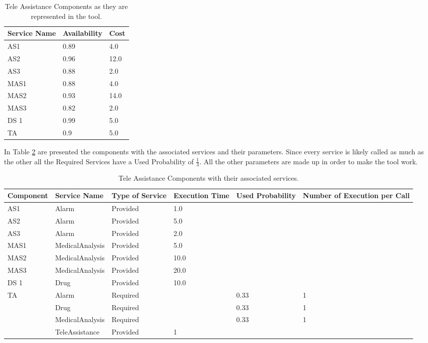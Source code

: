 \begin{table}[ht!b]
	\centering
	\begin{tabular}{|p{5cm}|p{3cm}|p{3cm}|}
		\hline 
		\textbf{Service Name} & \textbf{Availability} & \textbf{Cost} \\ 
		\hline 
		AS1 & 0.89 & 4.0 \\
		\hline 
		AS2 & 0.96 & 12.0 \\ 
		\hline 
		AS3 & 0.88 & 2.0 \\ 
		\hline 
		MAS1 & 0.88 & 4.0 \\ 
		\hline
		MAS2 & 0.93 & 14.0 \\ 
		\hline
		MAS3 & 0.82 & 2.0 \\ 
		\hline
		DS 1 & 0.99 & 5.0 \\ 
		\hline
		TA & 0.9 & 5.0 \\ 
		\hline
		
	\end{tabular} 
	\caption[TAS Components]{Tele Assistance Components as they are represented in the tool.}
	\label{tab:tas-comp}
\end{table}
In Table \ref{tab:tas-serv} are presented the components with the associated services and their parameters. Since every service is likely called as much as the other all the Required Services have a Used Probability of $ \frac{1}{3} $. All the other parameters are made up in order to make the tool work.
\begin{table}[ht!b]
	\centering
	\begin{tabular}{|p{2cm}|p{2.7cm}|p{1.7cm}|p{1.7cm}|p{1.7cm}|p{1.7cm}|}
		\hline 
		\textbf{Component} & \textbf{Service Name} & \textbf{Type of Service} & \textbf{Execution Time} & \textbf{Used Probability} & \textbf{Number of Execution per Call} \\ 
		\hline 
		AS1 & Alarm & Provided & 1.0 & & \\
		\hline 
		AS2 & Alarm & Provided & 5.0 & & \\
		\hline 
		AS3 & Alarm & Provided & 2.0 & & \\
		\hline 
		MAS1 & MedicalAnalysis & Provided & 5.0 & & \\ 
		\hline
		MAS2 & MedicalAnalysis & Provided & 10.0 & & \\ 
		\hline
		MAS3 & MedicalAnalysis & Provided & 20.0 & & \\ 
		\hline
		DS 1 & Drug & Provided & 10.0 & & \\
		\hline
		\multirow{4}{*}{TA} & Alarm & Required & & 0.33 & 1 \\
		& Drug & Required & & 0.33 & 1 \\
		& MedicalAnalysis & Required & & 0.33 & 1 \\
		& TeleAssistance & Provided & 1 & & \\
		\hline
		
	\end{tabular} 
	\caption[TAS Service]{Tele Assistance Components with their associated services.}
	\label{tab:tas-serv}
\end{table}

